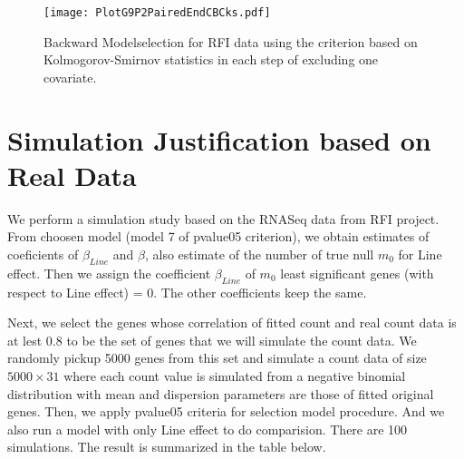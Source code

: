 \documentclass[12pt, letter]{article}\usepackage[]{graphicx}\usepackage[]{color}
\begin{document}
\begin{figure}[h!]
\centering
\texttt{[image: PlotG9P2PairedEndCBCks.pdf]}
\caption{Backward Modelselection for RFI data using the criterion based on Kolmogorov-Smirnov statistics in each step of excluding one covariate. }
\end{figure}


\section{\bf Simulation Justification based on Real Data}
We perform a simulation study based on the RNASeq data from RFI project. From choosen 
model (model 7 of pvalue05 criterion), we obtain estimates of coeficients of $\beta_{Line}$ and $\beta$, also estimate of the number of true null $m_{0}$ for Line effect. Then we assign the coefficient $\beta_{Line}$ of  $m_0$  least significant genes (with respect to Line effect) = 0. The other coefficients keep the same. 

Next, we select the genes whose correlation of fitted count and real count data is at lest 0.8 to be the set of genes that we will simulate the count data. We randomly pickup 5000 genes from this set and simulate a count data of size $5000\times 31$ where each count value is simulated from a negative binomial distribution with mean and dispersion parameters are those of fitted original genes. Then, we apply pvalue05 criteria for selection model procedure. And we also run a model with only Line effect to do comparision. There are 100 simulations. The result is summarized in the table below.
\end{document}
